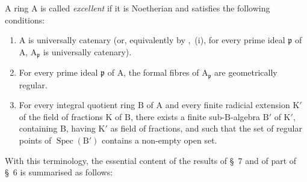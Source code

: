 \begin{definition}[7.8.2]
\label{IV.7.8.2}
A ring $\mathrm{A}$ is called \emph{excellent} if it is Noetherian and satisfies the following conditions:
\begin{enumerate}[label=(\roman*)]
  \item $\mathrm{A}$ is universally catenary (or, equivalently by ,~(i), for every prime ideal $\mathfrak{p}$ of $\mathrm{A}$, $\mathrm{A}_\mathfrak{p}$ is universally catenary).
  \item For every prime ideal $\mathfrak{p}$ of $\mathrm{A}$, the formal fibres of $\mathrm{A}_\mathfrak{p}$ are geometrically regular.
  \item For every integral quotient ring $\mathrm{B}$ of $\mathrm{A}$ and every finite radicial extension $\mathrm{K}'$ of the field of fractions $\mathrm{K}$ of $\mathrm{B}$, there exists a finite sub-$\mathrm{B}$-algebra $\mathrm{B}'$ of $\mathrm{K}'$, containing $\mathrm{B}$, having $\mathrm{K}'$ as field of fractions, and such that the set of regular points of $\operatorname{Spec}(\mathrm{B}')$ contains a non-empty open set.
\end{enumerate}
With this terminology, the essential content of the results of \S~7 and of part of \S~6 is summarised as follows:
\end{definition}

